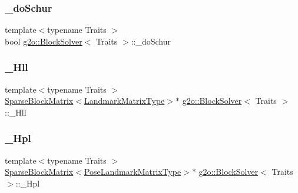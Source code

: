 \subsubsection{\texorpdfstring{\+\_\+do\+Schur}{\_doSchur}}
{\footnotesize\ttfamily template$<$typename Traits $>$ \\
bool \mbox{\hyperlink{classg2o_1_1_block_solver}{g2o\+::\+Block\+Solver}}$<$ Traits $>$\+::\+\_\+do\+Schur\hspace{0.3cm}{\ttfamily [protected]}}

\mbox{\label{classg2o_1_1_block_solver_a88d4c24df24a8fb72be1a4e4cff03d71}} 
\subsubsection{\texorpdfstring{\+\_\+\+Hll}{\_Hll}}
{\footnotesize\ttfamily template$<$typename Traits $>$ \\
\mbox{\hyperlink{classg2o_1_1_sparse_block_matrix}{Sparse\+Block\+Matrix}}$<$\mbox{\hyperlink{classg2o_1_1_block_solver_afd898a666343291129d37a979e23ded6}{Landmark\+Matrix\+Type}}$>$$\ast$ \mbox{\hyperlink{classg2o_1_1_block_solver}{g2o\+::\+Block\+Solver}}$<$ Traits $>$\+::\+\_\+\+Hll\hspace{0.3cm}{\ttfamily [protected]}}

\mbox{\label{classg2o_1_1_block_solver_a0f6051339990e95aa587145a8a6f4f5f}} 
\subsubsection{\texorpdfstring{\+\_\+\+Hpl}{\_Hpl}}
{\footnotesize\ttfamily template$<$typename Traits $>$ \\
\mbox{\hyperlink{classg2o_1_1_sparse_block_matrix}{Sparse\+Block\+Matrix}}$<$\mbox{\hyperlink{classg2o_1_1_block_solver_a96bf60b923f816086cd2f24de38736ec}{Pose\+Landmark\+Matrix\+Type}}$>$$\ast$ \mbox{\hyperlink{classg2o_1_1_block_solver}{g2o\+::\+Block\+Solver}}$<$ Traits $>$\+::\+\_\+\+Hpl\hspace{0.3cm}{\ttfamily [protected]}}

